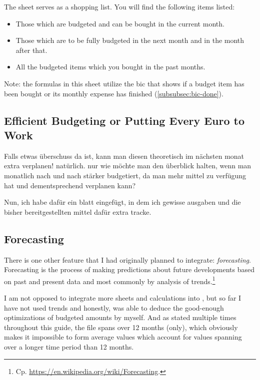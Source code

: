 The sheet  serves as a shopping list.
You will find the following items listed:
\begin{itemize}
	\item Those which are budgeted and can be bought in the current month.
	\item Those which are to be fully budgeted in the next month and in the month after that.
	\item All the budgeted items which you bought in the past months.
\end{itemize}

Note: the formulas in this sheet utilize the \ac{bic} that shows if a budget item has been bought or its monthly expense has finished (\autoref{subsubsec:bic-done}).

\subsection{Efficient Budgeting or Putting Every Euro to Work}
\label{subsec:efficient-budgeting}

Falls etwas überschuss da ist, kann man diesen theoretisch im nächsten monat extra verplanen! natürlich. nur wie möchte man den überblick halten, wenn man monatlich nach und nach stärker budgetiert, da man mehr mittel zu verfügung hat und dementsprechend verplanen kann?

Nun, ich habe dafür ein blatt eingefügt, in dem ich gewisse ausgaben und die bisher bereitgestellten mittel dafür extra tracke.

\subsection{Forecasting}
\label{subsec:forecasting}

There is one other feature that I had originally planned to integrate: \emph{forecasting}.
Forecasting is the process of making predictions about future developments based on past and present data and most commonly by analysis of trends.\footnote{Cp. \href{https://en.wikipedia.org/wiki/Forecasting}{https://en.wikipedia.org/wiki/Forecasting}.}

I am not opposed to integrate more sheets and calculations into \tfn, but so far I have not used trends and honestly, was able to deduce the good-enough optimizations of budgeted amounts by myself.
And as stated multiple times throughout this guide, the file spans over 12 months (only), which obviously makes it impossible to form average values which account for values spanning over a longer time period than 12 months.